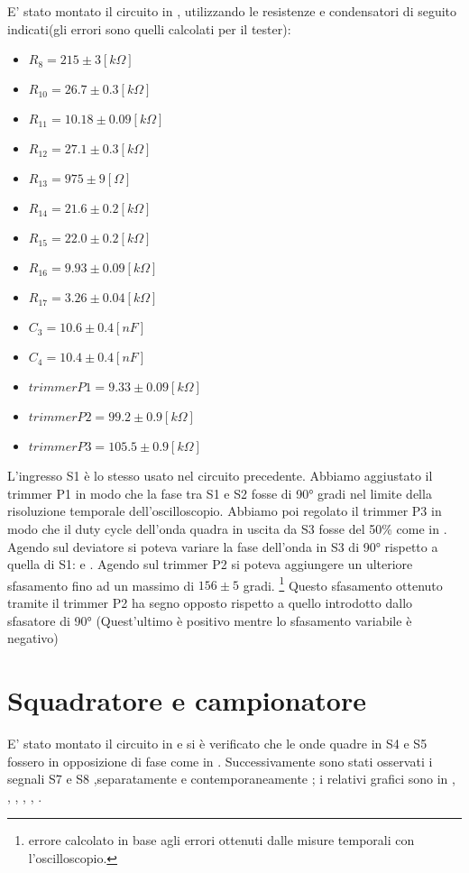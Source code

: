 E' stato montato il circuito in , utilizzando le resistenze e condensatori di seguito indicati(gli errori sono quelli calcolati per il tester):
\begin{itemize}
\item $R_8=215 \pm 3[k\Omega]$
\item $R_{10}=26.7 \pm 0.3[k\Omega]$
\item $R_{11}=10.18 \pm 0.09[k\Omega]$
\item $R_{12}=27.1 \pm 0.3[k\Omega]$
\item $R_{13}=975 \pm 9[\Omega]$
\item $R_{14}=21.6 \pm 0.2[k\Omega]$
\item $R_{15}=22.0 \pm 0.2[k\Omega]$
\item $R_{16}=9.93 \pm 0.09[k\Omega]$
\item $R_{17}=3.26 \pm 0.04[k\Omega]$
\item $C_3=10.6 \pm 0.4[nF]$
\item $C_4=10.4 \pm 0.4[nF]$
\item $trimmer P1 = 9.33 \pm  0.09[k\Omega]$
\item $trimmer P2 = 99.2 \pm  0.9[k\Omega]$
\item $trimmer P3 = 105.5 \pm  0.9[k\Omega]$
\end{itemize} 
L'ingresso S1 è lo stesso usato nel circuito precedente.
Abbiamo aggiustato il trimmer P1 in modo che la fase tra S1 e S2 fosse di \ang{90} gradi nel limite della risoluzione temporale dell'oscilloscopio.
Abbiamo poi regolato il trimmer P3 in modo che il duty cycle dell'onda quadra in uscita da S3 fosse del 50\% come in .
Agendo sul deviatore si poteva variare la fase dell'onda in S3 di \ang{90} rispetto a quella di S1:   e .
Agendo sul trimmer P2 si poteva aggiungere un ulteriore sfasamento fino ad un massimo di $156 \pm 5$ gradi. \footnote{errore calcolato in base agli errori ottenuti dalle misure temporali con l'oscilloscopio.} Questo sfasamento ottenuto tramite il trimmer P2 ha segno opposto rispetto a quello introdotto dallo sfasatore di \ang{90} (Quest'ultimo è positivo mentre lo sfasamento variabile è negativo)

\section{Squadratore e campionatore}
E' stato montato il circuito in  e si è verificato che le onde quadre in S4 e S5 fossero in opposizione di fase come in . Successivamente sono stati osservati i segnali S7 e S8 ,separatamente e contemporaneamente ; i relativi grafici sono in , , , , , .